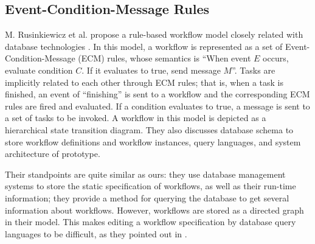 \subsection{Event-Condition-Message Rules}

M. Rusinkiewicz et al. propose a rule-based workflow model closely
related with database technologies \cite{jean:codas96}.  In this model,
a workflow is represented as a set of Event-Condition-Message (ECM)
rules, whose semantics is ``When event $E$ occurs, evaluate condition
$C$.  If it evaluates to true, send message $M$''.  Tasks are implicitly
related to each other through ECM rules; that is, when a task is
finished, an event of ``finishing'' is sent to a workflow and the
corresponding ECM rules are fired and evaluated.  If a condition
evaluates to true, a message is sent to a set of tasks to be invoked.  A
workflow in this model is depicted as a hierarchical state transition
diagram.  They also discusses database schema to store workflow
definitions and workflow instances, query languages, and system
architecture of prototype.

Their standpoints are quite similar as ours: they use database
management systems to store the static specification of workflows, as
well as their run-time information; they provide a method for querying
the database to get several information about workflows.  However,
workflows are stored as a directed graph in their model.  This makes
editing a workflow specification by database query languages to be
difficult, as they pointed out in \cite{jean:codas96}.